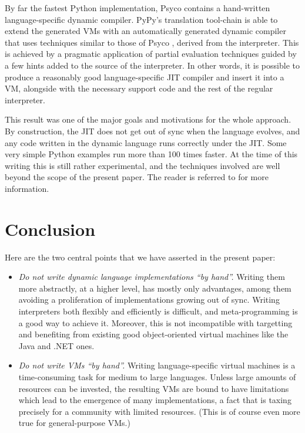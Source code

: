 \documentclass{llncs}
\begin{document}
By far the fastest Python implementation, Psyco \cite{psyco-software} contains a
hand-written language-specific dynamic compiler.  PyPy's translation
tool-chain is able to extend the generated VMs with an automatically
generated dynamic compiler that uses techniques similar to those of Psyco
\cite{Psyco-paper}, derived from the
interpreter.  This is achieved by a pragmatic application of partial
evaluation techniques guided by a few hints added to the source of the
interpreter.  In other words, it is possible to produce a reasonably
good language-specific JIT compiler and insert it into a VM, alongside
with the necessary support code and the rest of the regular interpreter.

This result was one of the major goals and motivations for the whole
approach.  By construction, the JIT does not get out of sync when the
language evolves, and any code written in the dynamic language runs
correctly under the JIT.  Some very simple Python examples run more than
100 times faster.  At the time of this writing this is still rather
experimental, and the techniques involved are well beyond the scope of
the present paper.  The reader is referred to \cite{D08.2} for more
information.


\section{Conclusion}

Here are the two central points that we have asserted in the present
paper:

\begin{itemize}
\item \emph{Do not write dynamic language implementations ``by hand''.}
Writing them more abstractly, at a higher level, has mostly only
advantages, among them avoiding a proliferation of implementations
growing out of sync.  Writing interpreters both flexibly and efficiently
is difficult, and meta-programming is a good way to achieve it.
Moreover, this is not incompatible with targetting and benefiting from
existing good object-oriented virtual machines like the Java and .NET
ones.

\item \emph{Do not write VMs ``by hand''.}
Writing language-specific virtual machines is a time-consuming task for
medium to large languages.  Unless large amounts of resources can be
invested, the resulting VMs are bound to have limitations which lead to
the emergence of many implementations, a fact that is taxing precisely
for a community with limited resources.  (This is of course even more
true for general-purpose VMs.)
\end{itemize}
\end{document}
